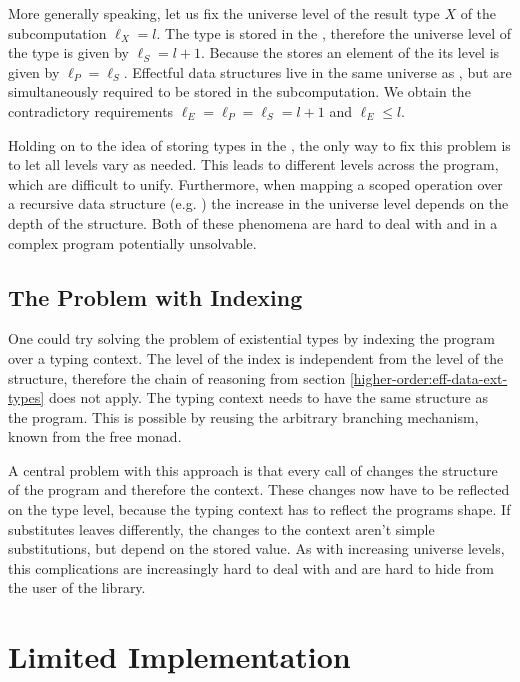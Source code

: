 More generally speaking, let us fix the universe level of the result type $X$ of
the subcomputation $\ell_X = l$.
The type is stored in the , therefore the universe level of the
 type is given by $\ell_S = l + 1$.
Because the  stores an element of the  its
level is given by $\ell_P = \ell_S$.
Effectful data structures live in the same universe as , but
are simultaneously required to be stored in the subcomputation.
We obtain the contradictory requirements $\ell_E = \ell_P = \ell_S = l + 1$ and
$\ell_E  \leqslant l$.

Holding on to the idea of storing types in the , the only way to
fix this problem is to let all levels vary as needed.
This leads to different levels across the program, which are difficult to unify.
Furthermore, when mapping a scoped operation over a recursive data structure
(e.g. ) the increase in the universe level depends on the
depth of the structure.
Both of these phenomena are hard to deal with and in a complex program
potentially unsolvable.


\subsection{The Problem with Indexing}

One could try solving the problem of existential types by indexing the program
over a typing context.
The level of the index is independent from the level of the structure, therefore
the chain of reasoning from section \ref{higher-order:eff-data-ext-types} does
not apply.
The typing context needs to have the same structure as the program.
This is possible by reusing the arbitrary branching mechanism, known from the
free monad.

A central problem with this approach is that every call of \AgdaFunction{>>=}
changes the structure of the program and therefore the context.
These changes now have to be reflected on the type level, because the typing
context has to reflect the programs shape.
If \AgdaFunction{>>=} substitutes leaves differently, the changes to the context
aren't simple substitutions, but depend on the stored value.
As with increasing universe levels, this complications are increasingly hard to
deal with and are hard to hide from the user of the library.


\section{Limited Implementation}
\label{higher-order:limited-impl}

